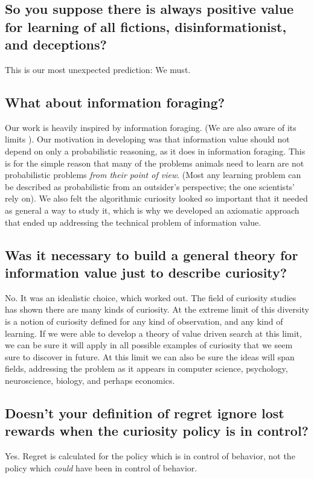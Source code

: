 \subsection*{So you suppose there is always positive value for learning of all fictions, disinformationist, and deceptions?}
This is our most unexpected prediction: We must.


\subsection*{What about information foraging?}
Our work is heavily inspired by information foraging. (We are also aware of its limits \cite{needed}). Our motivation in developing was that information value should not depend on only a probabilistic reasoning, as it does in information foraging. This is for the simple reason that many of the problems animals need to learn are not probabilistic problems \textit{from their point of view}. (Most any learning problem can be described as probabilistic from an outsider's perspective; the one scientists' rely on). We also felt the algorithmic curiosity looked so important that it needed as general a way to study it, which is why we developed an axiomatic approach that ended up addressing the technical problem of information value.


\subsection*{Was it necessary to build a general theory for information value just to describe curiosity?}
No. It was an idealistic choice, which worked out. The field of curiosity studies has shown there are many kinds of curiosity. At the extreme limit of this diversity is a notion of curiosity defined for any kind of observation, and any kind of learning. If we were able to develop a theory of value driven search at this limit, we can be sure it will apply in all possible examples of curiosity that we seem sure to discover in future. At this limit we can also be sure the ideas will span fields, addressing the problem as it appears in computer science, psychology, neuroscience, biology, and perhaps economics.


\subsection{Doesn't your definition of regret ignore lost rewards when the curiosity policy is in control?}
Yes. Regret is calculated for the policy which is in control of behavior, not the policy which \textit{could} have been in control of behavior.


